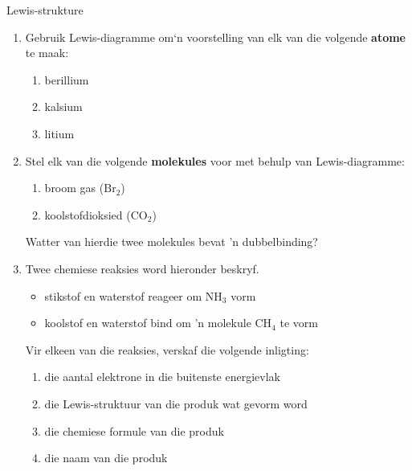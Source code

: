     \noindent
\label{m38701*secfhsst!!!underscore!!!id327}
            \begin{exercises}{Lewis-strukture}
            \nopagebreak
      \label{m38701*id140889}\begin{enumerate}[noitemsep, label=\textbf{\arabic*}. ] 
            \label{m38701*uid23}\item Gebruik Lewis-diagramme om‘n voorstelling van elk van die volgende \textbf{atome} te maak:
\label{m38701*id140910}\begin{enumerate}[noitemsep, label=\textbf{\alph*}. ] 
            \label{m38701*uid24}\item berillium
\label{m38701*uid25}\item kalsium
\label{m38701*uid26}\item litium
\end{enumerate}
                \label{m38701*uid27}\item  Stel elk van die volgende \textbf{molekules} voor met behulp van Lewis-diagramme:
\label{m38701*id140969}\begin{enumerate}[noitemsep, label=\textbf{\alph*}. ] 
            \label{m38701*uid28}\item broom gas ($\text{Br}{}_{2}$)
\label{m38701*uid29}\item koolstofdioksied ($\text{CO}{}_{2}$)
\end{enumerate}
Watter van hierdie twee molekules bevat 'n dubbelbinding?
\label{m38701*uid31}\item Twee chemiese reaksies word hieronder beskryf.
\label{m38701*id141048}\begin{itemize}[noitemsep]
            \label{m38701*uid32}\item stikstof en waterstof reageer om $\text{NH}_{3}$ vorm
\label{m38701*uid33}\item koolstof en waterstof bind om 'n molekule $\text{CH}_{4}$ te vorm
\end{itemize}
Vir elkeen van die reaksies, verskaf die volgende inligting:
\label{m38701*id141106}\begin{enumerate}[noitemsep, label=\textbf{\alph*}. ] 
\item die aantal elektrone in die buitenste energievlak
\label{m38701*uid35}\item die Lewis-struktuur van die produk wat gevorm word
\label{m38701*uid36}\item die chemiese formule van die produk
\label{m38701*uid37}\item die naam van die produk
\end{enumerate}

\end{enumerate}
\end{exercises}
